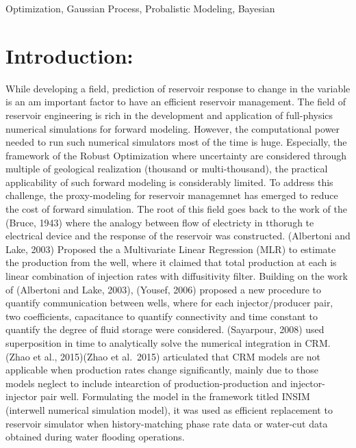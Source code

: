 \documentclass[]{elsarticle} %
\begin{document}
\begin{frontmatter}
\begin{abstract}
  \end{abstract}
   \begin{keyword} Optimization, Gaussian Process, Probalistic Modeling, Bayesian\end{keyword}
 \end{frontmatter}

\newpage

\hypertarget{introduction}{%
\section{Introduction:}\label{introduction}}

\doublespacing

While developing a field, prediction of reservoir response to change in
the variable is an am important factor to have an efficient reservoir
management. The field of reservoir engineering is rich in the
development and application of full-physics numerical simulations for
forward modeling. However, the computational power needed to run such
numerical simulators most of the time is huge. Especially, the framework
of the Robust Optimization where uncertainty are considered through
multiple of geological realization (thousand or multi-thousand), the
practical applicability of such forward modeling is considerably
limited. To address this challenge, the proxy-modeling for reservoir
managemnet has emerged to reduce the cost of forward simulation. The
root of this field goes back to the work of the (Bruce, 1943) where the
analogy between flow of electricty in tthorugh te electrical device and
the response of the reservoir was constructed. (Albertoni and Lake, 2003) Proposed
the a Multivariate Linear Regression (MLR) to estimate the production
from the well, where it claimed that total production at each is linear
combination of injection rates with diffusitivity filter. Building on
the work of (Albertoni and Lake, 2003), (Yousef, 2006) proposed a new procedure to
quantify communication between wells, where for each injector/producer
pair, two coefficients, capacitance to quantify connectivity and time
constant to quantify the degree of fluid storage were considered.
(Sayarpour, 2008) used superposition in time to analytically solve the
numerical integration in CRM. (Zhao et al., 2015)(Zhao et al.~2015) articulated
that CRM models are not applicable when production rates change
significantly, mainly due to those models neglect to include intearction
of production-production and injector-injector pair well. Formulating
the model in the framework titled INSIM (interwell numerical simulation
model), it was used as efficient replacement to reservoir simulator when
history-matching phase rate data or water-cut data obtained during water
flooding operations.
\end{document}
